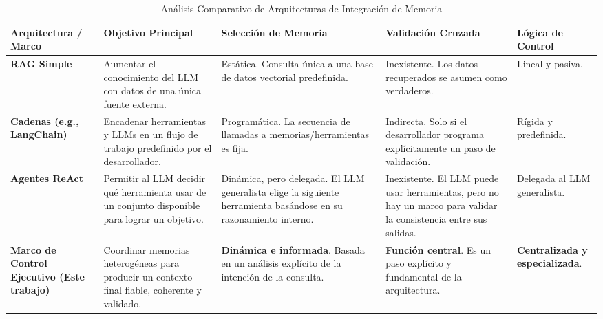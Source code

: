 \documentclass[journal,onecolumn]{IEEEtran}
\begin{document}
\begin{table*}[ht]
\centering
\caption{Análisis Comparativo de Arquitecturas de Integración de Memoria}
\label{tab:comparison}
\begin{tabularx}{\textwidth}{>{\bfseries}l X X X X}
\toprule
\textbf{Arquitectura / Marco} & \textbf{Objetivo Principal} & \textbf{Selección de Memoria} & \textbf{Validación Cruzada} & \textbf{Lógica de Control} \\
\midrule
\textbf{RAG Simple} & Aumentar el conocimiento del LLM con datos de una única fuente externa. & Estática. Consulta única a una base de datos vectorial predefinida. & Inexistente. Los datos recuperados se asumen como verdaderos. & Lineal y pasiva. \\
\addlinespace
\textbf{Cadenas (e.g., LangChain)} & Encadenar herramientas y LLMs en un flujo de trabajo predefinido por el desarrollador. & Programática. La secuencia de llamadas a memorias/herramientas es fija. & Indirecta. Solo si el desarrollador programa explícitamente un paso de validación. & Rígida y predefinida. \\
\addlinespace
\textbf{Agentes ReAct} & Permitir al LLM decidir qué herramienta usar de un conjunto disponible para lograr un objetivo. & Dinámica, pero delegada. El LLM generalista elige la siguiente herramienta basándose en su razonamiento interno. & Inexistente. El LLM puede usar herramientas, pero no hay un marco para validar la consistencia entre sus salidas. & Delegada al LLM generalista. \\
\addlinespace
\textbf{Marco de Control Ejecutivo (Este trabajo)} & Coordinar memorias heterogéneas para producir un contexto final fiable, coherente y validado. & \textbf{Dinámica e informada}. Basada en un análisis explícito de la intención de la consulta. & \textbf{Función central}. Es un paso explícito y fundamental de la arquitectura. & \textbf{Centralizada y especializada}. \\
\bottomrule
\end{tabularx}
\end{table*}
\end{document}
